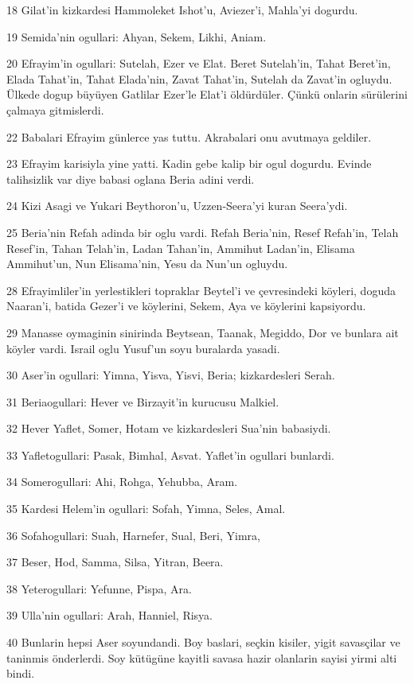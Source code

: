 \par 18 Gilat'in kizkardesi Hammoleket Ishot'u, Aviezer'i, Mahla'yi dogurdu.
\par 19 Semida'nin ogullari: Ahyan, Sekem, Likhi, Aniam.
\par 20 Efrayim'in ogullari: Sutelah, Ezer ve Elat. Beret Sutelah'in, Tahat Beret'in, Elada Tahat'in, Tahat Elada'nin, Zavat Tahat'in, Sutelah da Zavat'in ogluydu. Ülkede dogup büyüyen Gatlilar Ezer'le Elat'i öldürdüler. Çünkü onlarin sürülerini çalmaya gitmislerdi.
\par 22 Babalari Efrayim günlerce yas tuttu. Akrabalari onu avutmaya geldiler.
\par 23 Efrayim karisiyla yine yatti. Kadin gebe kalip bir ogul dogurdu. Evinde talihsizlik var diye babasi oglana Beria adini verdi.
\par 24 Kizi Asagi ve Yukari Beythoron'u, Uzzen-Seera'yi kuran Seera'ydi.
\par 25 Beria'nin Refah adinda bir oglu vardi. Refah Beria'nin, Resef Refah'in, Telah Resef'in, Tahan Telah'in, Ladan Tahan'in, Ammihut Ladan'in, Elisama Ammihut'un, Nun Elisama'nin, Yesu da Nun'un ogluydu.
\par 28 Efrayimliler'in yerlestikleri topraklar Beytel'i ve çevresindeki köyleri, doguda Naaran'i, batida Gezer'i ve köylerini, Sekem, Aya ve köylerini kapsiyordu.
\par 29 Manasse oymaginin sinirinda Beytsean, Taanak, Megiddo, Dor ve bunlara ait köyler vardi. Israil oglu Yusuf'un soyu buralarda yasadi.
\par 30 Aser'in ogullari: Yimna, Yisva, Yisvi, Beria; kizkardesleri Serah.
\par 31 Beriaogullari: Hever ve Birzayit'in kurucusu Malkiel.
\par 32 Hever Yaflet, Somer, Hotam ve kizkardesleri Sua'nin babasiydi.
\par 33 Yafletogullari: Pasak, Bimhal, Asvat. Yaflet'in ogullari bunlardi.
\par 34 Somerogullari: Ahi, Rohga, Yehubba, Aram.
\par 35 Kardesi Helem'in ogullari: Sofah, Yimna, Seles, Amal.
\par 36 Sofahogullari: Suah, Harnefer, Sual, Beri, Yimra,
\par 37 Beser, Hod, Samma, Silsa, Yitran, Beera.
\par 38 Yeterogullari: Yefunne, Pispa, Ara.
\par 39 Ulla'nin ogullari: Arah, Hanniel, Risya.
\par 40 Bunlarin hepsi Aser soyundandi. Boy baslari, seçkin kisiler, yigit savasçilar ve taninmis önderlerdi. Soy kütügüne kayitli savasa hazir olanlarin sayisi yirmi alti bindi.

